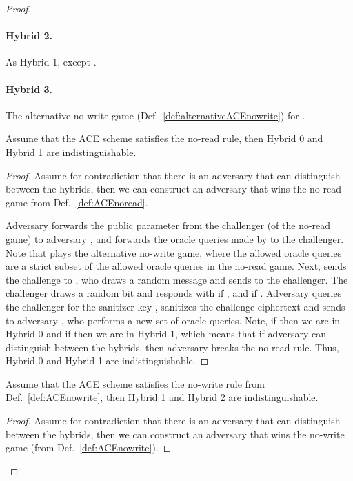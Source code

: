 \documentclass{llncs}
\begin{document}
\begin{proof}
\paragraph{Hybrid 2.} As Hybrid 1, except .

\paragraph{Hybrid 3.} The alternative no-write game (Def.~\ref{def:alternativeACEnowrite}) for .

\begin{claim}
Assume that the ACE scheme  satisfies the no-read rule, then Hybrid 0 and Hybrid 1 are indistinguishable.
\end{claim}

\begin{proof}
Assume for contradiction that there is an adversary  that can distinguish between the hybrids, then we can construct an adversary  that wins the no-read game from Def.~\ref{def:ACEnoread}.

Adversary  forwards the public parameter from the challenger (of the no-read game) to adversary , and forwards the oracle queries made by  to the challenger. Note that  plays the alternative no-write game, where the allowed oracle queries are a strict subset of the allowed oracle queries in the no-read game. 
Next,  sends the challenge  to , who draws a random message  and sends  to the challenger. 
The challenger draws a random bit  and responds with  if , and  if . 
Adversary  queries the challenger for the sanitizer key , sanitizes the challenge ciphertext  and sends  to adversary , who performs a new set of oracle queries. 
Note, if  then we are in Hybrid 0 and if  then we are in Hybrid 1, which means that if adversary  can distinguish between the hybrids, then adversary  breaks the no-read rule. Thus, Hybrid 0 and Hybrid 1 are indistinguishable.
\end{proof}

\begin{claim}
Assume that the ACE scheme  satisfies the no-write rule from Def.~\ref{def:ACEnowrite}, then Hybrid 1 and Hybrid 2 are indistinguishable.
\end{claim}

\begin{proof}
Assume for contradiction that there is an adversary  that can distinguish between the hybrids, then we can construct an adversary  that wins the no-write game (from Def.~\ref{def:ACEnowrite}).


\end{proof}
\end{proof}
\end{document}
